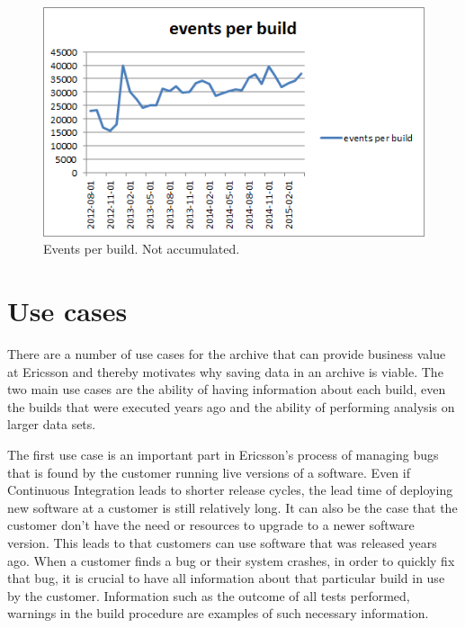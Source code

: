 \begin{figure}[h!]
\centering
\includegraphics[]{figure/events_per_build.png}
\caption{Events per build. Not accumulated.}
\label{fig:events_per_build}
\end{figure}


\section{Use cases}
\label{sec:usecases}

There are a number of use cases for the archive that can provide business value at Ericsson and thereby motivates why saving data in an archive is viable. The two main use cases are the ability of having information about each build, even the builds that were executed years ago and the ability of performing analysis on larger data sets. 

The first use case is an important part in Ericsson's process of managing bugs that is found by the customer running live versions of a software. Even if Continuous Integration leads to shorter release cycles, the lead time of deploying new software at a customer is still relatively long. It can also be the case that the customer don't have the need or resources to upgrade to a newer software version. This leads to that customers can use software that was released years ago. When a customer finds a bug or their system crashes, in order to quickly fix that bug, it is crucial to have all information about that particular build in use by the customer. Information such as the outcome of all tests performed, warnings in the build procedure are examples of such necessary information. 

